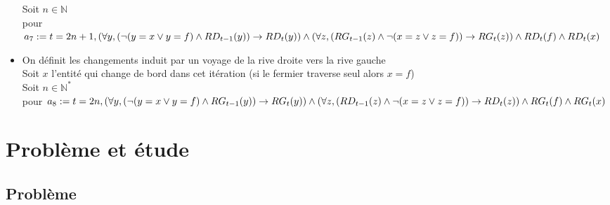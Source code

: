 \documentclass{article}
\newcommand{\N}{\mathbb{N}}
\begin{document}
\begin{itemize}
  Soit $n \in \N$\\
  pour $a_7:= t=2n+1,\\ (\forall y, (\neg (y = x \vee y = f) \wedge RD_{t-1}(y)) \to RD_{t}(y)) \wedge (\forall z,(RG_{t-1}(z) \wedge \neg(x=z \vee z=f)) \rightarrow RG_t(z)) \wedge RD_t(f) \wedge RD_t(x)$\\
  \item On définit les changements induit par un voyage de la rive droite vers la rive gauche\\
  Soit $x$ l'entité qui change de bord dans cet itération (si le fermier traverse seul alors $x =f$)\\
  Soit $n \in \N^*$\\
  pour $a_8 := t=2n,\\ (\forall y, (\neg (y = x \vee y = f) \wedge RG_{t-1}(y)) \to RG_{t}(y)) \wedge (\forall z,(RD_{t-1}(z) \wedge \neg(x=z \vee z=f)) \rightarrow RD_t(z)) \wedge RG_t(f) \wedge RG_t(x)$\\

\end{itemize}

\section{Problème et étude}
\subsection{Problème}


\end{document}
